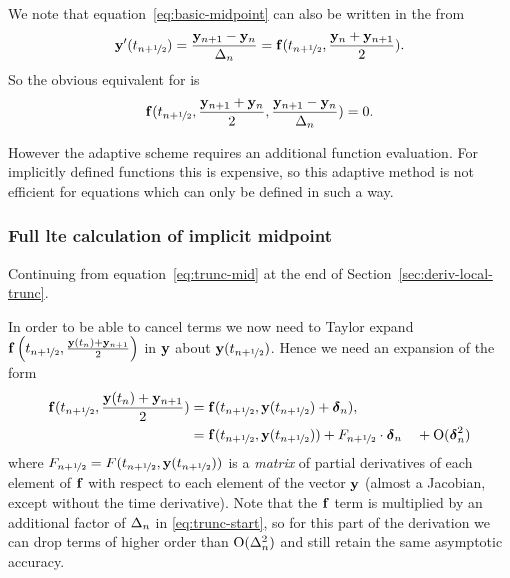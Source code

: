 We note that equation~\eqref{eq:basic-midpoint} can also be written in the from
\begin{equation}
  \mathbf{y}'(t_{n+\nicefrac{1}{2}}) = \frac{\mathbf{y}_{n+1} - \mathbf{y}_n}{\Delta_{n}} =  {\mathbf{f}}(t_{n+\nicefrac{1}{2}}, \frac{\mathbf{y}_n + \mathbf{y}_{n+1}}{2}).
\end{equation}
So the obvious equivalent for \imr is
\begin{equation}
  {\mathbf{f}}(t_{n+\nicefrac{1}{2}}, \frac{\mathbf{y}_{n+1} + \mathbf{y}_n}{2}, \frac{\mathbf{y}_{n+1} - \mathbf{y}_n}{\Delta_{n}}) = 0.
\end{equation}

However the adaptive scheme requires an additional function evaluation.
For implicitly defined functions this is expensive, so this adaptive method is not efficient for equations which can only be defined in such a way.


\subsubsection{Full lte calculation of implicit midpoint}
\label{sec:full-imr-lte-calculation}

Continuing from equation~\eqref{eq:trunc-mid} at the end of Section~\ref{sec:deriv-local-trunc}.

In order to be able to cancel terms we now need to Taylor expand ${\mathbf{f}}\left( t_{n+\nicefrac{1}{2}}, \frac{\mathbf{y}(t_n) + \mathbf{y}_{n+1}}{2} \right)$ in $\mathbf{y}$ about $\mathbf{y}(t_{n+\nicefrac{1}{2}})$.
Hence we need an expansion of the form
\begin{align}
  {\mathbf{f}}(t_{n+\nicefrac{1}{2}}, \frac{\mathbf{y}(t_n) + \mathbf{y}_{n+1}}{2}) &= {\mathbf{f}}(t_{n+\nicefrac{1}{2}}, \mathbf{y}(t_{n+\nicefrac{1}{2}}) + \mbox{\boldmath$\delta$}_{n}),
  \notag \\
  &= {\mathbf{f}}(t_{n+\nicefrac{1}{2}}, \mathbf{y}(t_{n+\nicefrac{1}{2}})) + F_{n+\nicefrac{1}{2}} \cdot \mbox{\boldmath$\delta$}_{n}  \quad + \text{O}(\mbox{\boldmath$\delta$}_{n}^2)
  \label{eq:f-taylor}
\end{align}
where $F_{n+\nicefrac{1}{2}} = F(t_{n+\nicefrac{1}{2}}, \mathbf{y}(t_{n+\nicefrac{1}{2}}))$ is a \emph{matrix} of partial derivatives of each element of ${\mathbf{f}}$ with respect to each element of the vector $\mathbf{y}$ (\ie almost a Jacobian, except without the time derivative).
Note that the ${\mathbf{f}}$ term is multiplied by an additional factor of $\Delta_{n}$ in \eqref{eq:trunc-start}, so for this part of the derivation we can drop terms of higher order than $\text{O}(\Delta_{n}^2)$ and still retain the same asymptotic accuracy.

